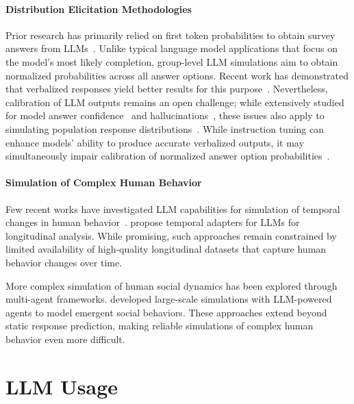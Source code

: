 \documentclass{article} %
\begin{document}
\paragraph{Distribution Elicitation Methodologies}
Prior research has primarily relied on first token probabilities to obtain survey answers from LLMs~\citep{santurkar2023opinionqa,NEURIPS2024_Dominguez,TjuatjaSurveyDesign}.
Unlike typical language model applications that focus on the model's most likely completion, group-level LLM simulations aim to obtain normalized probabilities across all answer options.
Recent work has demonstrated that verbalized responses yield better results for this purpose~\citep{tian-etal-2023-just,meister-etal-2025-benchmarking}.
Nevertheless, calibration of LLM outputs remains an open challenge; while extensively studied for model answer confidence~\citep{pmlr-v139-zhao21c,jiang-etal-2021-know,kapoor-etal-2024-calibration,zhu-etal-2023-calibration} and hallucinations~\citep{Kalai2024}, these issues also apply to simulating population response distributions~\cite{hu2026position}.
While instruction tuning can enhance models' ability to produce accurate verbalized outputs, it may simultaneously impair calibration of normalized answer option probabilities~\citep{NEURIPS2024_cruz}.

\paragraph{Simulation of Complex Human Behavior} 
Few recent works have investigated LLM capabilities for simulation of temporal changes in human behavior~\cite{NEURIPS2021_f5bf0ba0}.
\cite{ahnert2024extracting} propose temporal adapters for LLMs for longitudinal analysis.
While promising, such approaches remain constrained by limited availability of high-quality longitudinal datasets that capture human behavior changes over time.

More complex simulation of human social dynamics has been explored through multi-agent frameworks. \cite{park2024generative} developed large-scale simulations with LLM-powered agents to model emergent social behaviors.
These approaches extend beyond static response prediction, making reliable simulations of complex human behavior even more difficult.




\section{LLM Usage}
\end{document}
